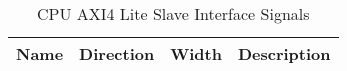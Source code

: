 \begin{table}[H]
  \centering
  \begin{tabular}{|l|l|r|p{9.5cm}|}
    
    \hline
    \rowcolor{iob-green}
    {\bf Name} & {\bf Direction} & {\bf Width} & {\bf Description}  \\ \hline \hline

    
 
  \end{tabular}
  \caption{CPU AXI4 Lite Slave Interface Signals}
  \label{axil_s_if_tab:is}
\end{table}

